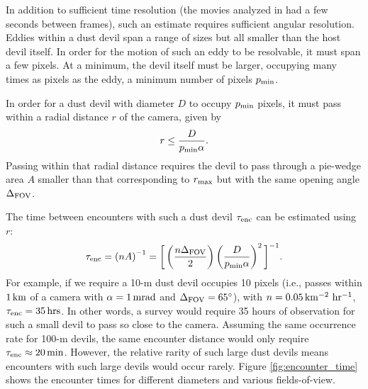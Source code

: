 \documentclass{aastex63}
\begin{document}
In addition to sufficient time resolution (the movies analyzed in \citealt{2006JGRE..11112S09G} had a few seconds between frames), such an estimate requires sufficient angular resolution. Eddies within a dust devil span a range of sizes but all smaller than the host devil itself. In order for the motion of such an eddy to be resolvable, it must span a few pixels. At a minimum, the devil itself must be larger, occupying many times as pixels as the eddy, a minimum number of pixels $p_{\rm min}$.

In order for a dust devil with diameter $D$ to occupy $p_{\rm min}$ pixels, it must pass within a radial distance $r$ of the camera, given by 
\begin{equation}
    r \le \frac{D}{p_{\rm min} \alpha}.
    \label{eqn:encounter_distance}
\end{equation}
Passing within that radial distance requires the devil to pass through a pie-wedge area $A$ smaller than that corresponding to $r_{\rm max}$ but with the same opening angle $\Delta_{\rm FOV}$.

The time between encounters with such a dust devil $\tau_{\rm enc}$ can be estimated using $r$:
\begin{equation}
    \tau_{\rm enc} = \left( n A \right)^{-1} = \bigg[ \left( \frac{n \Delta_{\rm FOV}}{2} \right) \left( \frac{D}{p_{\rm min} \alpha } \right)^2 \bigg]^{-1}.
    \label{eqn:tau}
\end{equation}
For example, if we require a 10-m dust devil occupies 10 pixels (i.e., passes within $1\,{\rm km}$ of a camera with $\alpha = 1\,{\rm mrad}$ and $\Delta_{\rm FOV} = 65^\circ$), with $n = 0.05\,{\rm km^{-2}\ hr^{-1}}$, $\tau_{\rm enc} = 35\,{\rm hrs}$. In other words, a survey would require 35 hours of observation for such a small devil to pass so close to the camera. Assuming the same occurrence rate for 100-m devils, the same encounter distance would only require $\tau_{\rm enc} \approx 20\,{\rm min}$. However, the relative rarity of such large dust devils means encounters with such large devils would occur rarely. Figure \ref{fig:encounter_time} shows the encounter times for different diameters and various fields-of-view.
\end{document}
